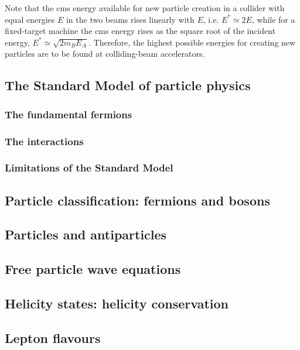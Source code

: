 \documentclass[en, device=normal]{elegantnote}
\begin{document}
Note that the cms energy available for new particle creation in a collider with equal energies 
$E$ in the two beams rises linearly with $E$, i.e. $E^*\simeq 2E$, while for a fixed-target 
machine the cms energy rises as the square root of the incident energy, $E^*\simeq\sqrt{2m_BE_A}$. 
Therefore, the highest possible energies for creating new particles are to be found at 
colliding-beam accelerators.

\subsection{The Standard Model of particle physics}

\subsubsection{The fundamental fermions}

\subsubsection{The interactions}

\subsubsection{Limitations of the Standard Model}

\subsection{Particle classification: fermions and bosons}

\subsection{Particles and antiparticles}

\subsection{Free particle wave equations}

\subsection{Helicity states: helicity conservation}

\subsection{Lepton flavours}
\end{document}
